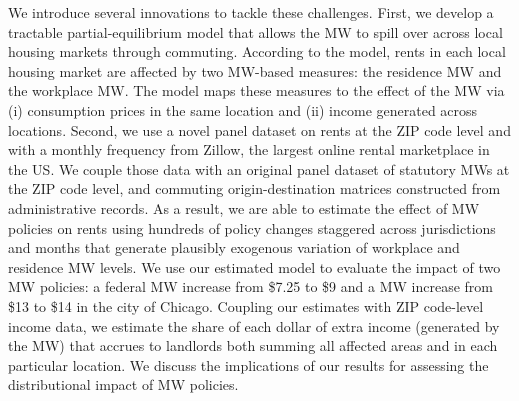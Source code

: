 
We introduce several innovations to tackle these challenges.
First, we develop a tractable partial-equilibrium model that allows the MW to 
spill over across local housing markets through commuting.
According to the model, rents in each local housing market are affected by 
two MW-based measures:
the residence MW and the workplace MW.
The model maps these measures to the effect of the MW via 
(i) consumption prices in the same location and
(ii) income generated across locations.
Second, we use a novel panel dataset on rents at the ZIP code level and with 
a monthly frequency from Zillow, the largest online rental marketplace in the 
US.
We couple those data with an original panel dataset of statutory MWs 
at the ZIP code level, and commuting origin-destination matrices constructed
from administrative records.
As a result, we are able to estimate the effect of MW policies on rents using 
hundreds of policy changes staggered across jurisdictions and months that 
generate plausibly exogenous variation of workplace and residence MW levels.
We use our estimated model to evaluate the impact of two MW policies:
a federal MW increase from \$7.25 to \$9 and
a MW increase from \$13 to \$14 in the city of Chicago.
Coupling our estimates with ZIP code-level income data, we estimate the share of 
each dollar of extra income (generated by the MW) that accrues to landlords
both summing all affected areas and in each particular location.
We discuss the implications of our results for assessing the distributional 
impact of MW policies.


